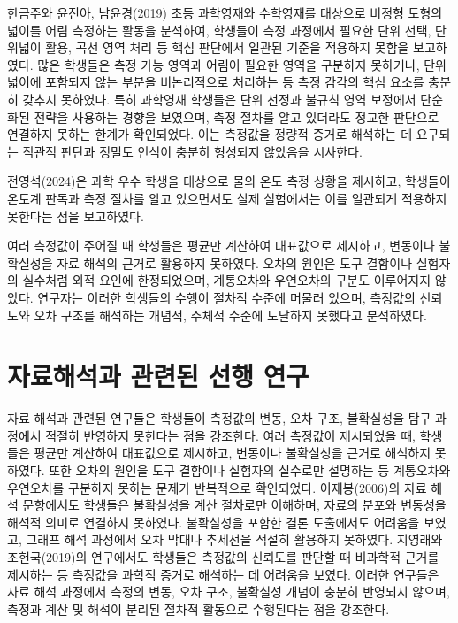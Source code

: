 한금주와 윤진아, 남윤경(2019) 초등 과학영재와 수학영재를 대상으로 비정형 도형의 넓이를
어림 측정하는 활동을 분석하여, 학생들이 측정 과정에서 필요한 단위 선택, 단위넓이 활용,
곡선 영역 처리 등 핵심 판단에서 일관된 기준을 적용하지 못함을 보고하였다.
%
많은 학생들은 측정 가능 영역과 어림이 필요한 영역을 구분하지 못하거나, 단위넓이에 포함되지
않는 부분을 비논리적으로 처리하는 등 측정 감각의 핵심 요소를 충분히 갖추지 못하였다.
%
특히 과학영재 학생들은 단위 선정과 불규칙 영역 보정에서 단순화된 전략을 사용하는 경향을 보였으며,
측정 절차를 알고 있더라도 정교한 판단으로 연결하지 못하는 한계가 확인되었다.
%
이는 측정값을 정량적 증거로 해석하는 데 요구되는 직관적 판단과 정밀도 인식이
충분히 형성되지 않았음을 시사한다.

전영석(2024)은 과학 우수 학생을 대상으로 물의 온도 측정 상황을 제시하고,
학생들이 온도계 판독과 측정 절차를 알고 있으면서도 실제 실험에서는
이를 일관되게 적용하지 못한다는 점을 보고하였다.

여러 측정값이 주어질 때 학생들은 평균만 계산하여 대표값으로 제시하고,
변동이나 불확실성을 자료 해석의 근거로 활용하지 못하였다.
오차의 원인은 도구 결함이나 실험자의 실수처럼 외적 요인에 한정되었으며,
계통오차와 우연오차의 구분도 이루어지지 않았다.
%
연구자는 이러한 학생들의 수행이 절차적 수준에 머물러 있으며,
측정값의 신뢰도와 오차 구조를 해석하는 개념적, 주체적 수준에 도달하지 못했다고 분석하였다. \\

\section{자료해석과 관련된 선행 연구}

자료 해석과 관련된 연구들은 학생들이
측정값의 변동, 오차 구조, 불확실성을 탐구 과정에서 적절히 반영하지 못한다는 점을 강조한다.
%
여러 측정값이 제시되었을 때, 학생들은 평균만 계산하여 대표값으로 제시하고,
변동이나 불확실성을 근거로 해석하지 못하였다.
또한 오차의 원인을 도구 결함이나 실험자의 실수로만 설명하는 등
계통오차와 우연오차를 구분하지 못하는 문제가 반복적으로 확인되었다.
%
이재봉(2006)의 자료 해석 문항에서도 학생들은 불확실성을 계산 절차로만 이해하며,
자료의 분포와 변동성을 해석적 의미로 연결하지 못하였다. 불확실성을 포함한 결론 도출에서도
어려움을 보였고, 그래프 해석 과정에서 오차 막대나 추세선을 적절히 활용하지 못하였다.
%
지영래와 조헌국(2019)의 연구에서도 학생들은 측정값의 신뢰도를 판단할 때 비과학적 근거를 제시하는 등
측정값을 과학적 증거로 해석하는 데 어려움을 보였다.
%
이러한 연구들은 자료 해석 과정에서 측정의 변동, 오차 구조, 불확실성 개념이 충분히 반영되지 않으며,
측정과 계산 및 해석이 분리된 절차적 활동으로 수행된다는 점을 강조한다. \\

